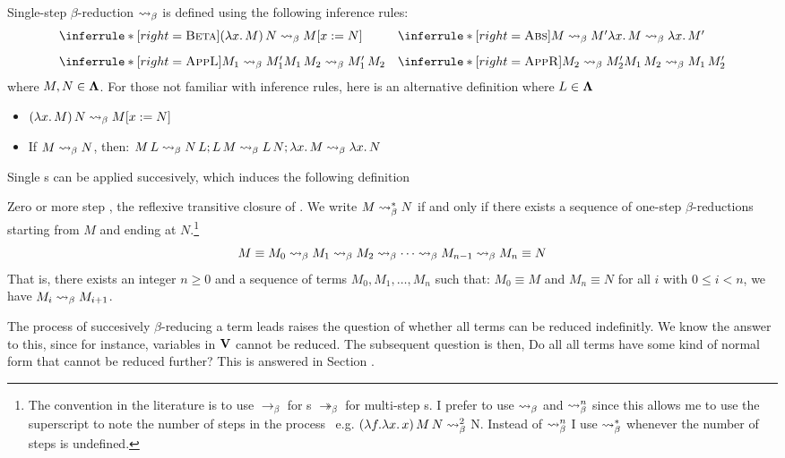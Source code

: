 \begin{definition} Single-step $\beta$-reduction $\mathrel{\leadsto}_\beta$ is defined using the following inference rules:
\[
\begin{array}{@{}l@{\quad}l@{}}
  \inferrule*[right=\textsc{Beta}]
    { }
    { (\lam{x}{M})\,N \step M\subst{x}{N} }
  &
  \inferrule*[right=\textsc{Abs}]
    { M \step M' }
    { \lam{x}{M} \step \lam{x}{M'} } \\[2ex]
  \inferrule*[right=\textsc{AppL}]
    { M_1 \step M_1' }
    { M_1\,M_2 \step M_1'\,M_2 }
  &
  \inferrule*[right=\textsc{AppR}]
    { M_2 \step M_2' }
    { M_1\,M_2 \step M_1\,M_2' }
\end{array}
\]
where \( M, N \in \mathbf{\Lambda} \). For those not familiar with inference rules, here is an alternative definition where \( L \in \mathbf{\Lambda} \)
\begin{itemize}
\item \( (\lambda x.\,M)\,N \mathrel{\leadsto}_\beta M[x := N] \)
\item If $M \mathrel{\leadsto}_\beta N$, then: \( M\,L \mathrel{\leadsto}_\beta N\,L; L\,M \mathrel{\leadsto}_\beta L\,N; \lambda x.\,M \mathrel{\leadsto}_\beta \lambda x.\,N \)
\end{itemize}
\end{definition} 
Single \bred s can be applied succesively, which induces the following definition
\begin{definition} Zero or more step \bred, the reflexive transitive closure of \bred. We write $M \mathrel{\leadsto}_\beta^* N$ if and only if there exists a sequence of one-step $\beta$-reductions starting from $M$ and ending at $N$.\footnote{The convention in the literature is to use $\rightarrow_\beta$ for \bred s $\twoheadrightarrow_\beta$ for multi-step \bred s. I prefer to use $\mathrel{\leadsto}_\beta$ and $\mathrel{\leadsto}_\beta^n$ since this allows me to use the superscript to note the number of steps in the process \bred \ e.g. $ (\lambda f. \lambda x . \, x) \, M \, N \mathrel{\leadsto}_\beta^2 $ N. Instead of $\mathrel{\leadsto}_\beta^n$ I use $\mathrel{\leadsto}_\beta^*$ whenever the number of steps is undefined.}
  \label{def:zero-more-bred}
  \[
    M \equiv M_0 \mathrel{\leadsto}_\beta M_1 \mathrel{\leadsto}_\beta M_2 \mathrel{\leadsto}_\beta \cdots \mathrel{\leadsto}_\beta M_{n-1} \mathrel{\leadsto}_\beta M_n \equiv N
  \]
  That is, there exists an integer $n \geq 0$ and a sequence of terms $M_0, M_1, \dots, M_n$ such that: $ M_0 \equiv M $ and $ M_n \equiv N $ for all $ i $ with $ 0 \leq i < n $, we have $ M_i \mathrel{\leadsto}_\beta M_{i+1} $.
\end{definition}
The process of succesively $\beta$-reducing a term leads raises the question of whether all terms can be reduced indefinitly. We know the answer to this, since for instance, variables in $\mathbf{V}$ cannot be reduced. The subsequent question is then, Do all all terms have some kind of normal form that cannot be reduced further? This is answered in Section .
